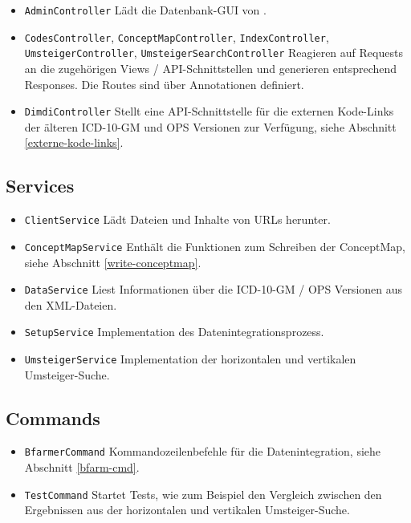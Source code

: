 \begin{itemize}
\item \texttt{AdminController} \newline Lädt die Datenbank-GUI von \cite{adminer}.
\item \texttt{CodesController}, \texttt{ConceptMapController}, \texttt{IndexController}, \newline
\texttt{UmsteigerController}, \texttt{UmsteigerSearchController}
\newline Reagieren auf Requests an die zugehörigen Views / API-Schnittstellen und generieren entsprechend Responses. Die Routes sind über Annotationen definiert. 
\item \texttt{DimdiController} \newline Stellt eine API-Schnittstelle für die externen Kode-Links der älteren ICD-10-GM und OPS Versionen zur Verfügung, siehe Abschnitt \ref{externe-kode-links}.
\end{itemize}

\subsection{Services}

\begin{itemize}
\item \texttt{ClientService} \newline Lädt Dateien und Inhalte von URLs herunter.
\item \texttt{ConceptMapService} \newline Enthält die Funktionen zum Schreiben der ConceptMap, siehe Abschnitt \ref{write-conceptmap}.
\item \texttt{DataService} \newline Liest Informationen über die ICD-10-GM / OPS Versionen aus den XML-Dateien. 
\item \texttt{SetupService} \newline Implementation des Datenintegrationsprozess. 
\item \texttt{UmsteigerService} \newline Implementation der horizontalen und vertikalen Umsteiger-Suche.
\end{itemize}

\subsection{Commands}

\begin{itemize}
\item \texttt{BfarmerCommand} \newline Kommandozeilenbefehle für die Datenintegration, siehe Abschnitt \ref{bfarm-cmd}.
\item \texttt{TestCommand} \newline Startet Tests, wie zum Beispiel den Vergleich zwischen den Ergebnissen aus der horizontalen und vertikalen Umsteiger-Suche. 
\end{itemize}

